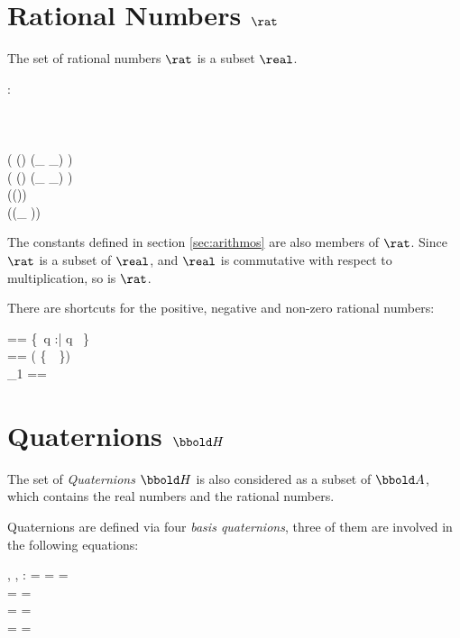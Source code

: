 \documentclass[12pt]{article}
\begin{document}
\section{Rational Numbers $\rat$}
\label{sec:rational-numbers}
The set of rational numbers $\rat$ is a subset $\real$.
%
\begin{axdef}
  \rat : \power \real
  \where
  \azero \in \rat\\
  \aone \in \rat\\
  \atwo \in \rat\\
  \aten \in \rat\\
  \ran ( (\rat \cross \rat) \dres (\_ \aplus \_) ) \subset \rat\\
  \ran ( (\rat \cross \rat) \dres (\_ \amult \_) ) \subset \rat\\
  \ran (\rat \dres (\aneg ))  \subset \rat\\
  \ran (\rat \dres (\_ \ainv ))  \subset \rat\\
\end{axdef}
The constants defined in section \ref{sec:arithmos} are also members
of $\rat$. Since $\rat$ is a subset of $\real$, and $\real$ is
commutative with respect to multiplication, so is $\rat$.
%

There are shortcuts for the positive, negative and non-zero rational numbers:
\begin{zed}
  \ratplus == \{~q :\rat | q \agt \azero~\}\\
  \ratminus == \rat \setminus ( \ratplus \cup \{~\azero~\}) \\
  \rat_1 == \ratplus \cup \ratminus \\
\end{zed}
%
\section{Quaternions $\quaternions$}
\label{sec:quaternions}
The set of \emph{Quaternions} $\quaternions$ is also considered as a
subset of $\arithmos$, which contains the real numbers and the
rational numbers.

Quaternions are defined via four \emph{basis quaternions}, three of
them are involved in the following equations:
%
\begin{axdef}
  \iu, \ju, \ku : \arithmos
  \where
  \iu \amult \iu = \ju \amult \ju = \ku \amult \ku = \aneg \aone\\
  \iu \amult \ju = \aneg \ju \amult \iu = \ku \\
  \ju \amult \ku = \aneg \ku \amult \ju = \iu \\
  \ku \amult \iu = \aneg \iu \amult \ku = \ju
\end{axdef}
\end{document}
